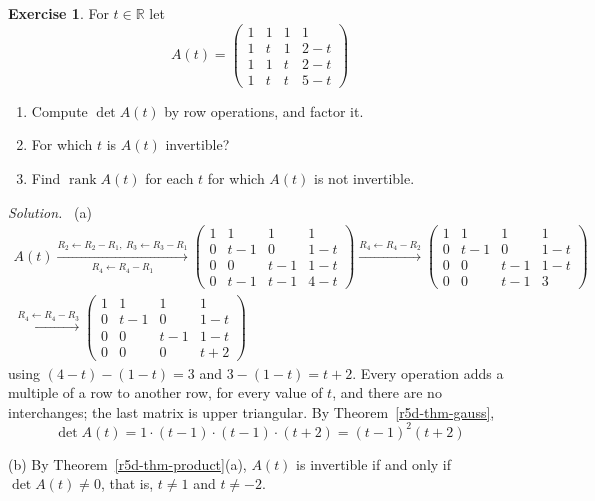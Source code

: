 \documentclass[12pt]{article}
\newcommand{\R}{\mathbb R}
\DeclareMathOperator{\rank}{rank}
\theoremstyle{definition}
\newtheorem{exercise}{Exercise}
\newenvironment{solution}{\par\noindent\textit{Solution.}\ }{\par\smallskip}
\begin{document}
\begin{exercise}\label{r5d-dr-parameter}
For \(t\in\R\) let
\[
A(t)=\begin{pmatrix}1&1&1&1\\1&t&1&2-t\\1&1&t&2-t\\1&t&t&5-t\end{pmatrix}
\]
\begin{enumerate}
\item Compute \(\det A(t)\) by row operations, and factor it.
\item For which \(t\) is \(A(t)\) invertible?
\item Find \(\rank A(t)\) for each \(t\) for which \(A(t)\) is not invertible.
\end{enumerate}
\end{exercise}
\begin{solution}
(a)
\[
\begin{gathered}
A(t)\xrightarrow[R_4\leftarrow R_4-R_1]{R_2\leftarrow R_2-R_1,\ R_3\leftarrow R_3-R_1}
\begin{pmatrix}1&1&1&1\\0&t-1&0&1-t\\0&0&t-1&1-t\\0&t-1&t-1&4-t\end{pmatrix}
\xrightarrow{R_4\leftarrow R_4-R_2}
\begin{pmatrix}1&1&1&1\\0&t-1&0&1-t\\0&0&t-1&1-t\\0&0&t-1&3\end{pmatrix}
\\
\xrightarrow{R_4\leftarrow R_4-R_3}
\begin{pmatrix}1&1&1&1\\0&t-1&0&1-t\\0&0&t-1&1-t\\0&0&0&t+2\end{pmatrix}
\end{gathered}
\]
using \((4-t)-(1-t)=3\) and \(3-(1-t)=t+2\). Every operation adds a multiple of a row to another row, for every value
of \(t\), and there are no interchanges; the last matrix is upper triangular. By Theorem~\ref{r5d-thm-gauss},
\[
\det A(t)=1\cdot(t-1)\cdot(t-1)\cdot(t+2)=(t-1)^2(t+2)
\]

(b) By Theorem~\ref{r5d-thm-product}(a), \(A(t)\) is invertible if and only if \(\det A(t)\ne0\), that is,
\(t\ne1\) and \(t\ne-2\).


\end{solution}
\end{document}
